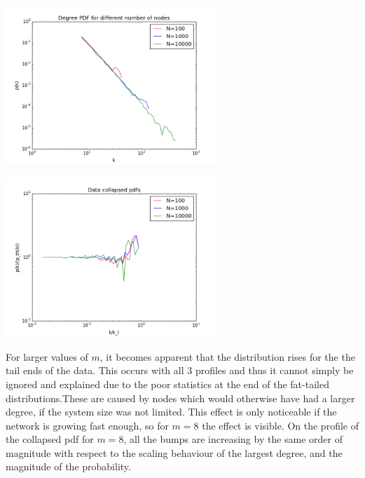 \documentclass[twoside]{article}
\begin{document}
\begin{multicols}{2}
\begin{center}
  \includegraphics[height=60mm]{degree_dist_varying_N2.png}
\end{center}
\begin{center}
  \includegraphics[height=60mm]{degree_dist_collapsed2.png}
\end{center}
\end{multicols}
For larger values of $m$, it becomes apparent that the distribution rises for the the tail ends of the data. This occurs with all 3 profiles and thus it cannot simply be ignored and explained due to the poor statistics at the end of the fat-tailed distributions.These are caused by nodes which would otherwise have had a larger degree, if the system size was not limited. This effect is only noticeable if the network is growing fast enough, so for $m=8$ the effect is visible. On the profile of the collapsed pdf for $m=8$, all the bumps are increasing by the same order of magnitude with respect to the scaling behaviour of the largest degree, and the magnitude of the probability.
\end{document}
